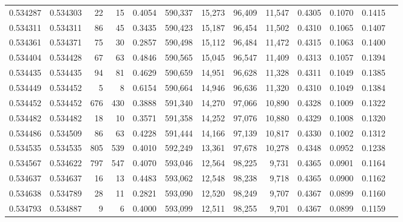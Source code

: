 \begin{tabular}{rrrrrrrrrrrrr}
0.534287 & 0.534303 &    22 &    15 &                                     0.4054 & 590,337 &  15,273 &  96,409 &  11,547 & 0.4305 & 0.1070 & 0.1415 \\
0.534311 & 0.534311 &    86 &    45 &                                     0.3435 & 590,423 &  15,187 &  96,454 &  11,502 & 0.4310 & 0.1065 & 0.1407 \\
0.534361 & 0.534371 &    75 &    30 &                                     0.2857 & 590,498 &  15,112 &  96,484 &  11,472 & 0.4315 & 0.1063 & 0.1400 \\
0.534404 & 0.534428 &    67 &    63 &                                     0.4846 & 590,565 &  15,045 &  96,547 &  11,409 & 0.4313 & 0.1057 & 0.1394 \\
0.534435 & 0.534435 &    94 &    81 &                                     0.4629 & 590,659 &  14,951 &  96,628 &  11,328 & 0.4311 & 0.1049 & 0.1385 \\
0.534449 & 0.534452 &     5 &     8 &                                     0.6154 & 590,664 &  14,946 &  96,636 &  11,320 & 0.4310 & 0.1049 & 0.1384 \\
0.534452 & 0.534452 &   676 &   430 &                                     0.3888 & 591,340 &  14,270 &  97,066 &  10,890 & 0.4328 & 0.1009 & 0.1322 \\
0.534482 & 0.534482 &    18 &    10 &                                     0.3571 & 591,358 &  14,252 &  97,076 &  10,880 & 0.4329 & 0.1008 & 0.1320 \\
0.534486 & 0.534509 &    86 &    63 &                                     0.4228 & 591,444 &  14,166 &  97,139 &  10,817 & 0.4330 & 0.1002 & 0.1312 \\
0.534535 & 0.534535 &   805 &   539 &                                     0.4010 & 592,249 &  13,361 &  97,678 &  10,278 & 0.4348 & 0.0952 & 0.1238 \\
0.534567 & 0.534622 &   797 &   547 &                                     0.4070 & 593,046 &  12,564 &  98,225 &   9,731 & 0.4365 & 0.0901 & 0.1164 \\
0.534637 & 0.534637 &    16 &    13 &                                     0.4483 & 593,062 &  12,548 &  98,238 &   9,718 & 0.4365 & 0.0900 & 0.1162 \\
0.534638 & 0.534789 &    28 &    11 &                                     0.2821 & 593,090 &  12,520 &  98,249 &   9,707 & 0.4367 & 0.0899 & 0.1160 \\
0.534793 & 0.534887 &     9 &     6 &                                     0.4000 & 593,099 &  12,511 &  98,255 &   9,701 & 0.4367 & 0.0899 & 0.1159 \\

\end{tabular}
